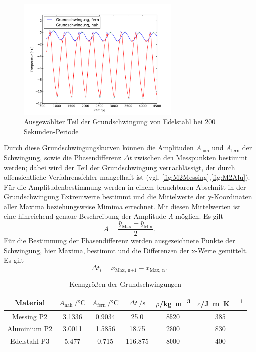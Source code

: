 \begin{figure}[h]
	\label{fig:M3EdelstahlNormkurve}
	\centering
	\includegraphics[width=0.7\textwidth]{Bilder/M3_Edelstahl_norm.pdf}
	\caption{Ausgewählter Teil der Grundschwingung von Edelstahl bei 200 Sekunden-Periode}
\end{figure}

Durch diese Grundschwingungskurven können die Amplituden $A_{\text{nah}}$ und $A_{\text{fern}}$ der Schwingung, sowie die Phasendifferenz $\Delta t$ zwischen den Messpunkten bestimmt werden; 
dabei wird der Teil der Grundschwingung vernachlässigt, der durch offensichtliche Verfahrensfehler mangelhaft ist
(vgl. \ref{fig:M2Messing},\ref{fig:M2Alu}).
Für die Amplitudenbestimmung werden in einem brauchbaren Abschnitt in der Grundschwingung Extremwerte bestimmt und die Mittelwerte der y-Koordinaten aller Maxima beziehungsweise Mimima errechnet.
Mit diesen Mittelwerten ist eine hinreichend genaue Beschreibung der Amplitude $A$ möglich.
Es gilt
\begin{equation}
	A = \frac{\bar{y}_{\text{Max}}-\bar{y}_{\text{Min}}}{2}.
\end{equation}
Für die Bestimmung der Phasendifferenz werden ausgezeichnete Punkte der Schwingung, hier Maxima, bestimmt und die Differenzen der x-Werte  gemittelt.
Es gilt
\begin{equation}
	\Delta{t_i} = {x}_{\text{Max, n+1}}-{x}_{\text{Max, n}}.
\end{equation}
\begin{table}[htbp]
	\centering
	\label{tab:kappazutaten}
	\begin{tabular}{c S[table-format=1.5] S[table-format=1.5] S[table-format=3.3] c c}
		\toprule
		{Material}&{$A_\text{nah} \:/\si{\degreeCelsius}$}&{$A_\text{fern}\:/\si{\degreeCelsius}$}&{$\Delta{t}\:/\si{\second}$}&{$\rho$\:/\:\si{\kilo\gram\per\meter\cubed}}&{$c$\:/\:\si{\joule\per\meter\per\kelvin}}\\
		\midrule
		{Messing P2}& 	{3.1336}&{0.9034}&	{25.0}&		{8520}&{385}\\
		{Aluminium P2}&	{3.0011}&{1.5856}&	{18.75}&	{2800}&{830}\\
		{Edelstahl P3}&	{5.477}&{0.715}&	{116.875}&	{8000}&{400}\\
		\bottomrule
	\end{tabular}
	\caption{Kenngrößen der Grundschwingungen}
\end{table}

